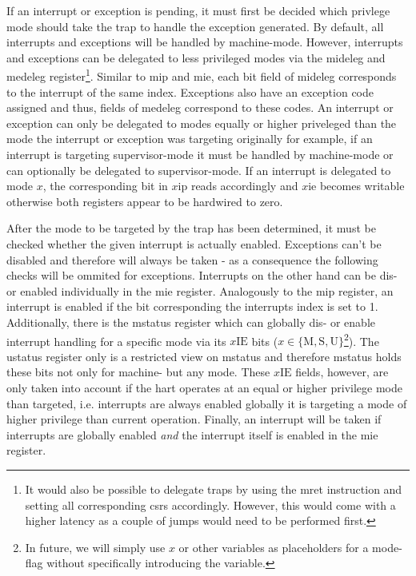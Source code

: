 If an interrupt or exception is pending, it must first be decided which privlege mode should take the trap to handle the exception generated.
By default, all interrupts and exceptions will be handled by machine-mode.
However, interrupts and exceptions can be delegated to less privileged modes via the \gls{mideleg} and \gls{medeleg} register\footnote{%
    It would also be possible to delegate traps by using the \gls{mret} instruction and setting all corresponding \glspl{csr} accordingly.
    However, this would come with a higher latency as a couple of jumps would need to be performed first.
}.
Similar to \gls{mip} and \gls{mie}, each bit field of \gls{mideleg} corresponds to the interrupt of the same index.
Exceptions also have an exception code assigned and thus, fields of \gls{medeleg} correspond to these codes.
An interrupt or exception can only be delegated to modes equally or higher priveleged than the mode the interrupt or exception was targeting originally for example, if an interrupt is targeting supervisor-mode it must be handled by machine-mode or can optionally be delegated to supervisor-mode.
If an interrupt is delegated to mode $ x $, the corresponding bit in $ x\text{ip} $ reads accordingly and $ x\text{ie} $ becomes writable otherwise both registers appear to be hardwired to zero.

After the mode to be targeted by the trap has been determined, it must be checked whether the given interrupt is actually enabled.
Exceptions can't be disabled and therefore will always be taken - as a consequence the following checks will be ommited for exceptions.
Interrupts on the other hand can be dis- or enabled individually in the \gls{mie} register.
Analogously to the \gls{mip} register, an interrupt is enabled if the bit corresponding the interrupts index is set to 1.
Additionally, there is the \gls{mstatus} register which can globally dis- or enable interrupt handling for a specific mode via its $ x\text{IE} $ bits ($ x \in \{ \text{M}, \text{S}, \text{U}\} $\footnote{%
    In future, we will simply use $ x $ or other variables as placeholders for a mode-flag without specifically introducing the variable.
}).
The \gls{ustatus} register only is a restricted view on \gls{mstatus} and therefore \gls{mstatus} holds these bits not only for machine- but any mode.
These $ x\text{IE} $ fields, however, are only taken into account if the \gls{hart} operates at an equal or higher privilege mode than targeted, i.e. interrupts are always enabled globally it is targeting a mode of higher privilege than current operation.
Finally, an interrupt will be taken if interrupts are globally enabled \textit{and} the interrupt itself is enabled in the \gls{mie} register.

